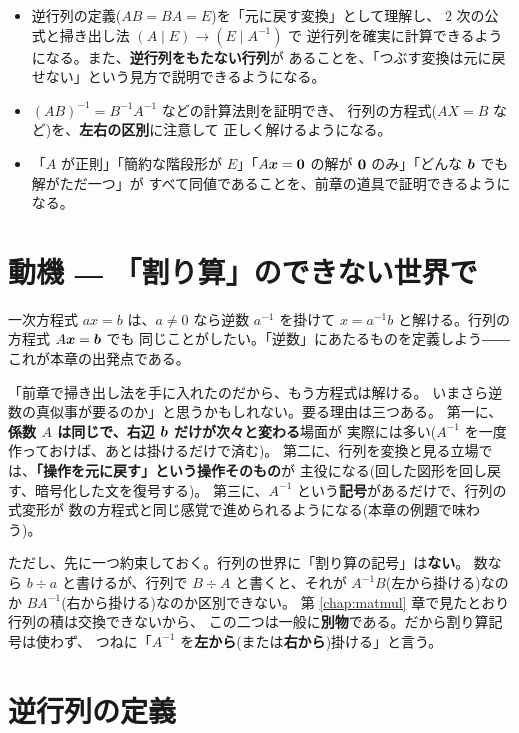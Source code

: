 \begin{goal}
\begin{itemize}
\item 逆行列の定義($AB = BA = E$)を「元に戻す変換」として理解し、
$2$ 次の公式と掃き出し法 $(A \mid E) \to (E \mid A^{-1})$ で
逆行列を確実に計算できるようになる。また、\textbf{逆行列をもたない行列}が
あることを、「つぶす変換は元に戻せない」という見方で説明できるようになる。
\item $(AB)^{-1} = B^{-1}A^{-1}$ などの計算法則を証明でき、
行列の方程式($AX = B$ など)を、\textbf{左右の区別}に注意して
正しく解けるようになる。
\item 「$A$ が正則」「簡約な階段形が $E$」「$A\bm{x} = \bm{0}$ の解が
$\bm{0}$ のみ」「どんな $\bm{b}$ でも解がただ一つ」が
すべて同値であることを、前章の道具で証明できるようになる。
\end{itemize}
\end{goal}

\section{動機 ― 「割り算」のできない世界で}

一次方程式 $ax = b$ は、$a \neq 0$ なら逆数 $a^{-1}$ を掛けて
$x = a^{-1} b$ と解ける。行列の方程式 $A\bm{x} = \bm{b}$ でも
同じことがしたい。「逆数」にあたるものを定義しよう――これが本章の出発点である。

「前章で掃き出し法を手に入れたのだから、もう方程式は解ける。
いまさら逆数の真似事が要るのか」と思うかもしれない。要る理由は三つある。
第一に、\textbf{係数 $A$ は同じで、右辺 $\bm{b}$ だけが次々と変わる}場面が
実際には多い($A^{-1}$ を一度作っておけば、あとは掛けるだけで済む)。
第二に、行列を変換と見る立場では、\textbf{「操作を元に戻す」という操作そのもの}が
主役になる(回した図形を回し戻す、暗号化した文を復号する)。
第三に、$A^{-1}$ という\textbf{記号}があるだけで、行列の式変形が
数の方程式と同じ感覚で進められるようになる(本章の例題で味わう)。

ただし、先に一つ約束しておく。行列の世界に「割り算の記号」は\textbf{ない}。
数なら $b \div a$ と書けるが、行列で $B \div A$ と書くと、それが
$A^{-1}B$(左から掛ける)なのか $BA^{-1}$(右から掛ける)なのか区別できない。
第 \ref{chap:matmul} 章で見たとおり行列の積は交換できないから、
この二つは一般に\textbf{別物}である。だから割り算記号は使わず、
つねに「$A^{-1}$ を\textbf{左から}(または\textbf{右から})掛ける」と言う。

\section{逆行列の定義}


